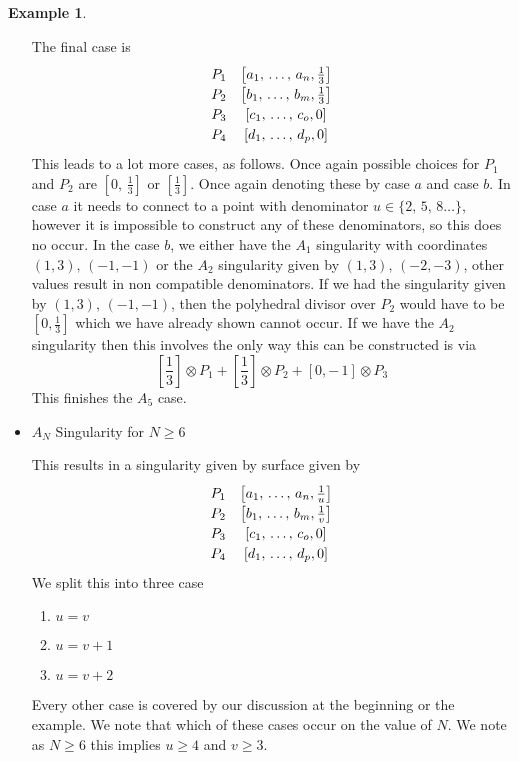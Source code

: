 \documentclass[12pt,a4paper]{book}      %
\theoremstyle{definition}
\newtheorem{ex}[thm]{Example}
\begin{document}
\begin{ex}
\begin{itemize}
The final case is 
\[\def\arraystretch{1.2}
\begin{array}{cc}
P_1 & \left[ a_1, \, \dots , \, a_n, \frac{1}{3} \right] \\ 
P_2 & \left[b_1 , \, \dots, \, b_m, \frac{1}{3} \right] \\
P_3 & \left[c_1, \, \dots, \, c_o, 0\right] \\
P_4 & \left[d_1, \, \dots, \, d_p, 0\right]  \\
\end{array}
\]
This leads to a lot more cases, as follows. Once again possible choices for $P_1$ and $P_2$ are $\left[ 0, \, \frac{1}{3} \right]$ or $\left[ \frac{1}{3} \right]$. Once again denoting these by case $a$ and case $b$. In case $a$ it needs to connect to a point with denominator $ u \in \{2, \, 5, \, 8 \dots \}$, however it is impossible to construct any of these denominators, so this does no occur. In the case $b$, we either have the $A_1$ singularity with coordinates $(1, 3),\, (-1, -1)$ or the $A_2$ singularity given by $(1, 3),\, (-2, -3)$, other values result in non compatible denominators. If we had the singularity given by $(1, 3),\, (-1, -1)$, then the polyhedral divisor over $P_2$ would have to be $\left[ 0, \frac{1}{3} \right]$ which we have already shown cannot occur. If we have the $A_2$ singularity then this involves the only way this can be constructed is via 
\[
\left[\frac{1}{3} \right] \otimes P_1 + \left[\frac{1}{3} \right] \otimes P_2 + [0, -\, 1] \otimes P_3
\]
This finishes the $A_5$ case.

\item \begin{bf} $A_N$ Singularity for $N \geq 6$ \end{bf}

This results in a singularity given by surface given by 
\[\def\arraystretch{1.2}
\begin{array}{cc}
P_1 & \left[ a_1, \, \dots , \, a_n, \frac{1}{u} \right] \\ 
P_2 & \left[b_1 , \, \dots, \, b_m, \frac{1}{v} \right] \\
P_3 & \left[c_1, \, \dots, \, c_o, 0\right] \\
P_4 & \left[d_1, \, \dots, \, d_p, 0\right]  \\
\end{array}
\]
We split this into three case 
\begin{enumerate}[label =\alph*)]
\item $u = v$
\item $u = v + 1$
\item $u = v + 2$
\end{enumerate}
Every other case is covered by our discussion at the beginning or the example. We note that which of these cases occur on the value of $N$. We note as $N \geq 6$ this implies $u \geq 4$ and $v \geq 3$.


\end{itemize}
\end{ex}
\end{document}
